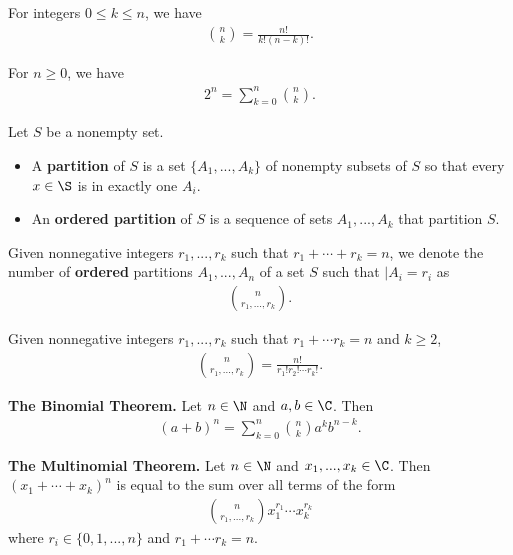 \documentclass{article}
\begin{document}
\begin{theorem}
    For integers $0\leq k \leq n$, we have
    \begin{align*}
        \binom{n}{k}=\frac{n!}{k!(n-k)!}.
    \end{align*}
\end{theorem}
\begin{corollary}
    For $n\geq 0$, we have
    \begin{align*}
        2^n = \sum_{k=0}^n \binom{n}{k}.
    \end{align*}
\end{corollary}
\begin{definition}
    Let $S$ be a nonempty set.
    \begin{itemize}
        \item A \textbf{partition} of $S$ is a set $\{A_1,...,A_k\}$ of nonempty subsets of $S$ so that every $x\in\S$ is in exactly one $A_i$.
        \item An \textbf{ordered partition} of $S$ is a sequence of sets $A_1,...,A_k$ that partition $S$.
    \end{itemize}
\end{definition}
\begin{definition}
    Given nonnegative integers $r_1, ..., r_k$ such that $r_1+\cdots + r_k=n$, we denote the number of \textbf{ordered} partitions $A_1,..., A_n$ of a set $S$ such that $|A_i=r_i$ as
    \begin{align*}
        \binom{n}{r_1,...,r_k}.
    \end{align*}
\end{definition}
\begin{theorem}
    Given nonnegative integers $r_1, ..., r_k$ such that $r_1+\cdots r_k=n$ and $k\geq 2$,
    \begin{align*}
        \binom{n}{r_1, ..., r_k}=\frac{n!}{r_1!r_2!\cdots r_k!}.
    \end{align*}
\end{theorem}
\begin{theorem}
    \textbf{The Binomial Theorem.} Let $n\in\N$ and $a,b\in\C$. Then
    \begin{align*}
        (a+b)^n=\sum_{k=0}^n \binom{n}{k}a^kb^{n-k}.
    \end{align*}
\end{theorem}
\begin{theorem}
    \textbf{The Multinomial Theorem.} Let $n\in\N$ and $x_1, ..., x_k\in\C$. Then $(x_1+\cdots+x_k)^n$ is equal to the sum over all terms of the form
    \begin{align*}
        \binom{n}{r_1,...,r_k}x_1^{r_1}\cdots x_k^{r_k}
    \end{align*}
    where $r_i\in\{0,1,...,n\}$ and $r_1+\cdots r_k=n$.
\end{theorem}
\end{document}
